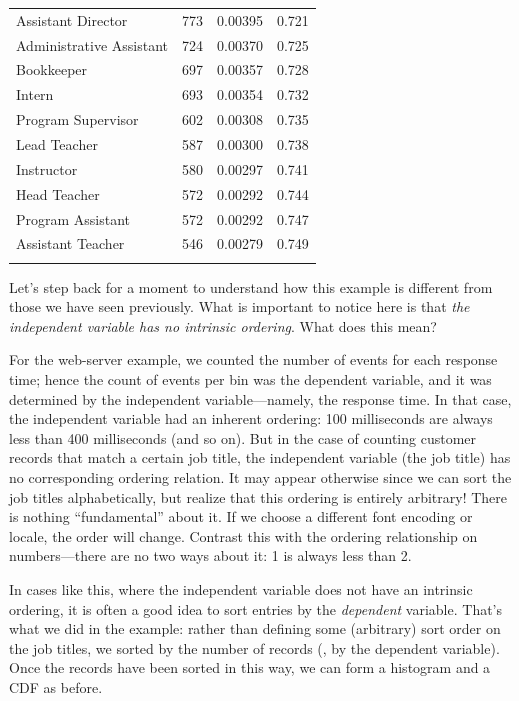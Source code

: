 \begin{table}
\begin{tabular}{lrrr}
Assistant Director       &    773  &  0.00395   &   0.721 \\
Administrative Assistant &    724  &  0.00370   &   0.725 \\
Bookkeeper               &    697  &  0.00357   &   0.728 \\
Intern                   &    693  &  0.00354   &   0.732 \\
Program Supervisor       &    602  &  0.00308   &   0.735 \\
Lead Teacher             &    587  &  0.00300   &   0.738 \\
Instructor               &    580  &  0.00297   &   0.741 \\
Head Teacher             &    572  &  0.00292   &   0.744 \\
Program Assistant        &    572  &  0.00292   &   0.747 \\
Assistant Teacher        &    546  &  0.00279   &   0.749\\
\botrule
\end{tabular}
\end{table}

Let's step back for a moment to understand how this example is
different from those we have seen previously. What is important to
notice here is that \emph{the independent variable has no intrinsic
  ordering}. What does this mean?

For the web-server example, we counted the number of events for each
response time; hence the count of events per bin was the dependent
variable, and it was determined by the independent variable---namely,
the response time. In that case, the independent variable had an
inherent ordering: 100 milliseconds are always less than 400
milliseconds (and so on). But in the case of counting customer records
that match a certain job title, the independent variable (the job
title) has no corresponding ordering relation. It may appear otherwise
since we can sort the job titles alphabetically, but realize that this
ordering is entirely arbitrary! There is nothing ``fundamental'' about
it. If we choose a different font encoding or locale, the order will
change.  Contrast this with the ordering relationship on
numbers---there are no two ways about it: 1 is always less than 2.

In cases like this, where the independent variable does not have an
intrinsic ordering, it is often a good idea to sort entries by the
\emph{dependent} variable. That's what we did in the example: rather
than defining some (arbitrary) sort order on the job titles, we sorted
by the number of records (\ie, by the dependent variable). Once the
records have been sorted in this way, we can form a histogram and a
CDF as before.

